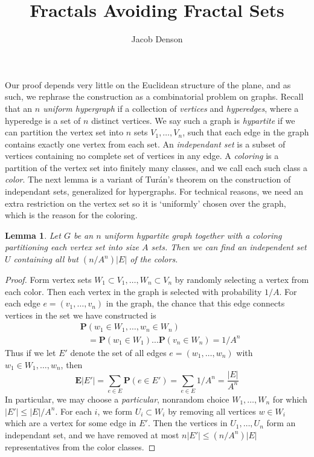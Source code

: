 \documentclass{article}
\title{Fractals Avoiding Fractal Sets}
\author{Jacob Denson}
\theoremstyle{plain}
\newtheorem{lemma}{Lemma}
\theoremstyle{plain}
\begin{document}
\maketitle

\begin{multicols}{2}

Our proof depends very little on the Euclidean structure of the plane, and as such, we rephrase the construction as a combinatorial problem on graphs. Recall that an {\it $n$ uniform hypergraph} if a collection of {\it vertices} and {\it hyperedges}, where a hyperedge is a set of $n$ distinct vertices. We say such a graph is {\it hypartite} if we can partition the vertex set into $n$ sets $V_1, \dots, V_n$, such that each edge in the graph contains exactly one vertex from each set. An {\it independant set} is a subset of vertices containing no complete set of vertices in any edge. A {\it coloring} is a partition of the vertex set into finitely many classes, and we call each such class a {\it color}. The next lemma is a variant of Tur\'{a}n's theorem on the construction of independant sets, generalized for hypergraphs. For technical reasons, we need an extra restriction on the vertex set so it is `uniformly' chosen over the graph, which is the reason for the coloring.

\begin{lemma}
	Let $G$ be an $n$ uniform hypartite graph together with a coloring partitioning each vertex set into size $A$ sets. Then we can find an independent set $U$ containing all but $(n/A^n)|E|$ of the colors.
\end{lemma}
\begin{proof}
	Form vertex sets $W_1 \subset V_1, \dots, W_n \subset V_n$ by randomly selecting a vertex from each color. Then each vertex in the graph is selected with probability $1/A$. For each edge $e = (v_1, \dots, v_n)$ in the graph, the chance that this edge connects vertices in the set we have constructed is
	\begin{align*}
		&\mathbf{P}(w_1 \in W_1, \dots, w_n \in W_n)\\
		&\ \ \ \ = \mathbf{P}(w_1 \in W_1) \dots \mathbf{P}(v_n \in W_n) = 1/A^n
	\end{align*}
	Thus if we let $E'$ denote the set of all edges $e = (w_1, \dots, w_n)$ with $w_1 \in W_1, \dots, w_n$, then
	\[ \mathbf{E}|E'| = \sum_{e \in E} \mathbf{P}(e \in E') = \sum_{e \in E} 1/A^n = \frac{|E|}{A^n} \]
	In particular, we may choose a {\it particular}, nonrandom choice $W_1, \dots, W_n$ for which $|E'| \leq |E|/A^n$. For each $i$, we form $U_i \subset W_i$ by removing all vertices $w \in W_i$ which are a vertex for some edge in $E'$. Then the vertices in $U_1, \dots, U_n$ form an independant set, and we have removed at most $n |E'| \leq (n/A^n) |E|$ representatives from the color classes.
\end{proof}


\end{multicols}
\end{document}
